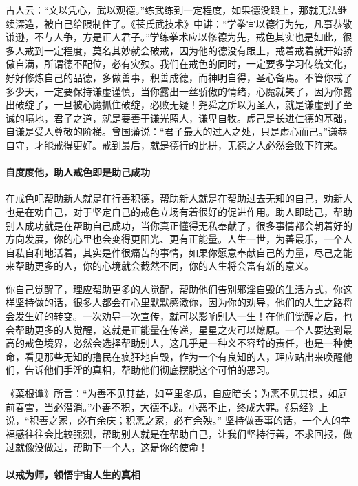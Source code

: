 古人云：“文以凭心，武以观德。”练武练到一定程度，如果德没跟上，那就无法继续深造，被自己给限制住了。《苌氏武技术》中讲：“学拳宜以德行为先，凡事恭敬谦逊，不与人争，方是正人君子。”学练拳术应以修德为先，戒色其实也是如此，很多人戒到一定程度，莫名其妙就会破戒，因为他的德没有跟上，戒着戒着就开始骄傲自满，所谓德不配位，必有灾殃。我们在戒色的同时，一定要多学习传统文化，好好修炼自己的品德，多做善事，积善成德，而神明自得，圣心备焉。不管你戒了多少天，一定要保持谦虚谨慎，当你露出一丝骄傲的情绪，心魔就笑了，因为你露出破绽了，一旦被心魔抓住破绽，必败无疑！尧舜之所以为圣人，就是谦虚到了至诚的境地，君子之道，就是要善于谦光照人，谦卑自牧。虚己是长进仁德的基础，自谦是受人尊敬的阶梯。曾国藩说：“君子最大的过人之处，只是虚心而己。”谦恭自守，才能戒得更好。戒到最后，就是德行的比拼，无德之人必然会败下阵来。

\paragraph{自度度他，助人戒色即是助己成功}

在戒色吧帮助新人就是在行善积德，帮助新人就是在帮助过去无知的自己，劝新人也是在劝自己，对于坚定自己的戒色立场有着很好的促进作用。助人即助己，帮助别人成功就是在帮助自己成功，当你真正懂得无私奉献了，很多事情都会朝着好的方向发展，你的心里也会变得更阳光、更有正能量。人生一世，为善最乐，一个人自私自利地活着，其实是件很痛苦的事情，如果你愿意奉献自己的力量，尽己之能来帮助更多的人，你的心境就会截然不同，你的人生将会富有新的意义。

你自己觉醒了，理应帮助更多的人觉醒，帮助他们告别邪淫自毁的生活方式，你这样坚持做的话，很多人都会在心里默默感激你，因为你的劝导，他们的人生之路将会发生好的转变。一次劝导一次宣传，就可以影响别人一生！在他们觉醒之后，也会帮助更多的人觉醒，这就是正能量在传递，星星之火可以燎原。一个人要达到最高的戒色境界，必然会选择帮助别人，这几乎是一种义不容辞的责任，也是一种使命，看见那些无知的撸民在疯狂地自毁，作为一个有良知的人，理应站出来唤醒他们，告诉他们手淫的真相，帮助他们彻底摆脱这个可怕的恶习。

《菜根谭》所言：“为善不见其益，如草里冬瓜，自应暗长；为恶不见其损，如庭前春雪，当必潜消。”小善不积，大德不成。小恶不止，终成大罪。《易经》上说，“积善之家，必有余庆；积恶之家，必有余殃。” 坚持做善事的话，一个人的幸福感往往会比较强烈，帮助别人就是在帮助自己，让我们坚持行善，不求回报，做过就像没做过，帮助下一个人，这是你的使命！

\paragraph{以戒为师，领悟宇宙人生的真相}

